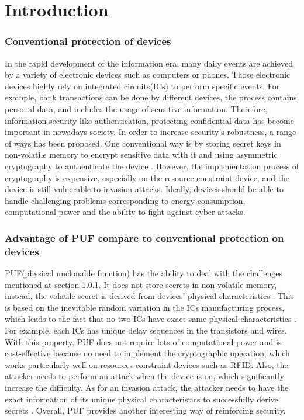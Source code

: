 \chapter{Introduction}

\subsection{Conventional protection of devices}
In the rapid development of the information era, many daily events are achieved by a variety of electronic devices such as computers or phones.
Those electronic devices highly rely on integrated circuits(ICs) to perform specific events. For example, bank transactions can be done by different devices,
the process contains personal data, and includes the usage of sensitive information. Therefore, information security like authentication, protecting confidential data
has become important in nowadays society. In order to increase security's robustness, a range of ways has been proposed. One conventional way is by storing secret keys in non-volatile memory to encrypt sensitive data with it
and using asymmetric cryptography to authenticate the device \cite{Reference3}. However, the implementation process of cryptography is expensive, especially on the resource-constraint device, and the device is still vulnerable to invasion attacks. Ideally, devices should be able to handle challenging problems corresponding to energy consumption, 
computational power and the ability to fight against cyber attacks. \par

\subsection{Advantage of PUF compare to conventional protection on devices}
PUF(physical unclonable function) has the ability to deal with the challenges mentioned at section 1.0.1. It does not store secrets in non-volatile memory, instead, the volatile secret is derived from devices' physical characteristics \cite{Reference3}.
This is based on the inevitable random variation in the ICs manufacturing process, which leads to the fact that no two ICs have exact same physical characteristics \cite{Reference3}. For example, each ICs has unique delay sequences in the transistors and wires.
With this property, PUF does not require lots of computational power and is cost-effective because no need to implement the cryptographic operation, which works particularly well on
resources-constraint devices such as RFID. Also, the attacker needs to perform an attack when the device is on, which significantly increase the difficulty. As for an invasion attack, 
the attacker needs to have the exact information of its unique physical characteristics to successfully derive secrets \cite{Reference3}. Overall, PUF provides another interesting way of reinforcing security.

